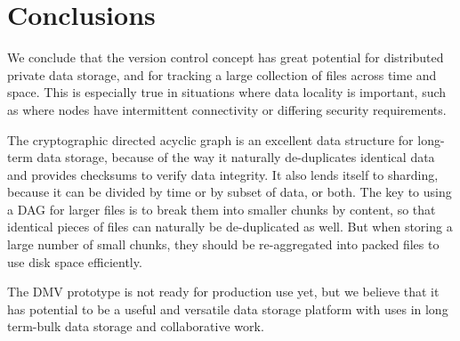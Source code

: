 \section{Conclusions}

We conclude that the version control concept has great potential for distributed
private data storage, and for tracking a large collection of files across time
and space. This is especially true in situations where data locality is
important, such as where nodes have intermittent connectivity or differing
security requirements.

The cryptographic directed acyclic graph is an excellent data structure for
long-term data storage, because of the way it naturally de-duplicates identical
data and provides checksums to verify data integrity. It also lends itself to
sharding, because it can be divided by time or by subset of data, or both. The
key to using a DAG for larger files is to break them into smaller chunks by
content, so that identical pieces of files can naturally be de-duplicated as
well. But when storing a large number of small chunks, they should be
re-aggregated into packed files to use disk space efficiently.

The DMV prototype is not ready for production use yet, but we believe that it
has potential to be a useful and versatile data storage platform with uses in
long term-bulk data storage and collaborative work.
